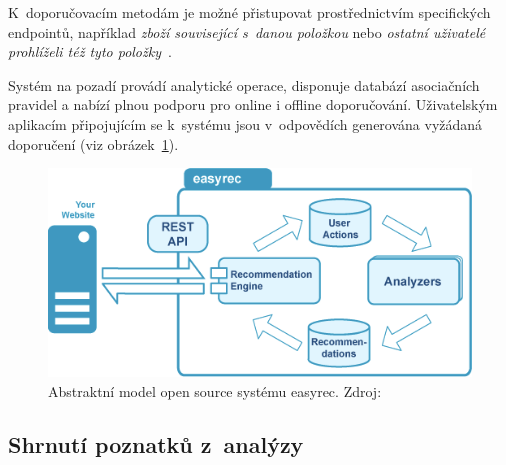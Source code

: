 \documentclass[thesis=M,czech]{FITthesis}[2014/05/07]
\begin{document}
K~doporučovacím metodám je možné přistupovat prostřednictvím specifických endpointů, například \emph{zboží související s~danou položkou} nebo \emph{ostatní uživatelé prohlíželi též tyto položky}~\cite{ibm}. 

Systém na pozadí provádí analytické operace, disponuje databází asociačních pravidel a nabízí plnou podporu pro online i offline doporučování. Uživatelským aplikacím připojujícím se k~systému jsou v~odpovědích generována vyžádaná doporučení (viz obrázek~\ref{fig:easyrec}).

\begin{figure}\centering
	\includegraphics[width=1.0\textwidth]{obr/easyrec.png}
 	\caption[Abstraktní model open source systému easyrec]{Abstraktní model open source systému easyrec. Zdroj: \cite{easyrec}}\label{fig:easyrec}
\end{figure}	

\subsection{Shrnutí poznatků z~analýzy}  
\end{document}
